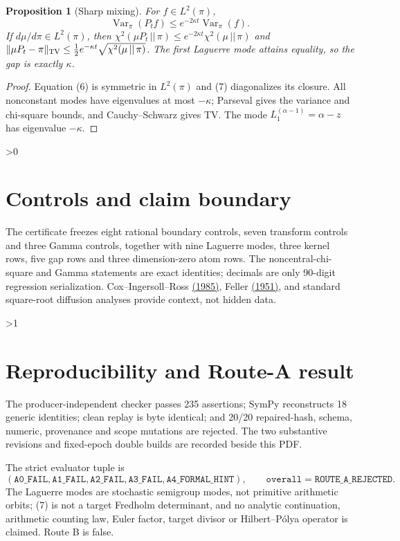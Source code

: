 \documentclass[10pt]{article}
\newtheorem{proposition}{Proposition}
\begin{document}
\begin{proposition}[Sharp mixing]\label{prop:gap}
For $f\in L^2(\pi)$,
\[
 \operatorname{Var}_\pi(P_tf)\leq e^{-2\kappa t}\operatorname{Var}_\pi(f).
\]
If $d\mu/d\pi\in L^2(\pi)$, then
$\chi^2(\mu P_t\,||\,\pi)\leq e^{-2\kappa t}\chi^2(\mu\,||\,\pi)$ and
$\|\mu P_t-\pi\|_{\rm TV}\leq\tfrac12e^{-\kappa t}
\sqrt{\chi^2(\mu\,||\,\pi)}$.  The first Laguerre mode attains equality,
so the gap is exactly $\kappa$.
\end{proposition}
\begin{proof}
Equation (6) is symmetric in $L^2(\pi)$ and (7) diagonalizes its closure.
All nonconstant modes have eigenvalues at most $-\kappa$; Parseval gives the
variance and chi-square bounds, and Cauchy--Schwarz gives TV.  The mode
$L_1^{(\alpha-1)}=\alpha-z$ has eigenvalue $-\kappa$.
\end{proof}

\ifnum\CRevisionRound>0
\section{Controls and claim boundary}
The certificate freezes eight rational boundary controls, seven transform
controls and three Gamma controls, together with nine Laguerre modes, three
kernel rows, five gap rows and three dimension-zero atom rows.  The
noncentral-chi-square and Gamma statements are exact identities; decimals are
only 90-digit regression serialization.  Cox--Ingersoll--Ross
\href{https://doi.org/10.2307/1911252}{(1985)}, Feller
\href{https://doi.org/10.2307/1906748}{(1951)}, and standard square-root
diffusion analyses provide context, not hidden data.
\fi

\ifnum\CRevisionRound>1
\section{Reproducibility and Route-A result}
The producer-independent checker passes 235 assertions; SymPy reconstructs 18
generic identities; clean replay is byte identical; and 20/20 repaired-hash,
schema, numeric, provenance and scope mutations are rejected.  The two
substantive revisions and fixed-epoch double builds are recorded beside this
PDF.

The strict evaluator tuple is
\[
(\mathtt{A0\_FAIL},\mathtt{A1\_FAIL},\mathtt{A2\_FAIL},\mathtt{A3\_FAIL},
 \mathtt{A4\_FORMAL\_HINT}),\qquad
\mathtt{overall=ROUTE\_A\_REJECTED}.
\]
The Laguerre modes are stochastic semigroup modes, not primitive arithmetic
orbits; (7) is not a target Fredholm determinant, and no analytic continuation,
arithmetic counting law, Euler factor, target divisor or Hilbert--Pólya
operator is claimed.  Route B is false.
\fi
\end{document}
